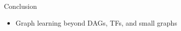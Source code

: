 \begin{frame}{Conclusion}
\begin{itemize}
    \item Graph learning beyond DAGs, TFs, and small graphs


\end{itemize}
\end{frame}
